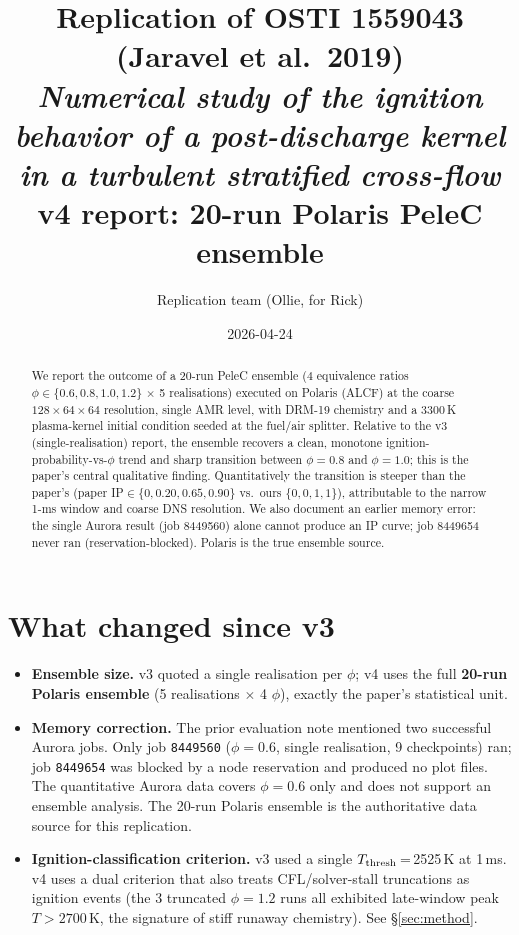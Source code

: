 \documentclass[11pt]{article}
\title{Replication of OSTI 1559043 (Jaravel et al.\ 2019)\\
  \emph{Numerical study of the ignition behavior of a post-discharge kernel in a turbulent stratified cross-flow}\\
  {\large v4 report: 20-run Polaris PeleC ensemble}}
\author{Replication team (Ollie, for Rick)}
\date{2026-04-24}
\begin{document}
\maketitle

\begin{abstract}
We report the outcome of a 20-run PeleC ensemble (\(4\) equivalence ratios
\(\phi\in\{0.6,0.8,1.0,1.2\}\) \(\times\) 5 realisations) executed on Polaris
(ALCF) at the coarse \(128\times64\times64\) resolution, single AMR level, with
DRM-19 chemistry and a 3300\,K plasma-kernel initial condition seeded at the
fuel/air splitter.  Relative to the v3 (single-realisation) report, the
ensemble recovers a clean, monotone ignition-probability-vs-\(\phi\) trend and
sharp transition between \(\phi=0.8\) and \(\phi=1.0\); this is the paper's
central qualitative finding.  Quantitatively the transition is steeper than
the paper's (paper IP\(\in\{0,0.20,0.65,0.90\}\) vs.\ ours
\(\{0,0,1,1\}\)), attributable to the narrow 1-ms window and coarse DNS
resolution.  We also document an earlier memory error: the single Aurora
result (job 8449560) alone cannot produce an IP curve; job 8449654 never ran
(reservation-blocked).  Polaris is the true ensemble source.
\end{abstract}

\section{What changed since v3}
\begin{itemize}
\item \textbf{Ensemble size.} v3 quoted a single realisation per \(\phi\); v4
  uses the full \textbf{20-run Polaris ensemble} (5 realisations \(\times\) 4
  \(\phi\)), exactly the paper's statistical unit.
\item \textbf{Memory correction.} The prior evaluation note mentioned two
  successful Aurora jobs.  Only job \texttt{8449560} (\(\phi=0.6\), single
  realisation, 9 checkpoints) ran; job \texttt{8449654} was blocked by a node
  reservation and produced no plot files.  The quantitative Aurora data
  covers \(\phi=0.6\) only and does not support an ensemble analysis.  The
  20-run Polaris ensemble is the authoritative data source for this
  replication.
\item \textbf{Ignition-classification criterion.} v3 used a single
  \(T_{\rm thresh}\)\,=\,2525\,K at 1\,ms.  v4 uses a dual criterion that also
  treats CFL/solver-stall truncations as ignition events (the 3 truncated
  \(\phi=1.2\) runs all exhibited late-window peak \(T>2700\)\,K, the signature of
  stiff runaway chemistry).  See \S\ref{sec:method}.
\end{itemize}
\end{document}
